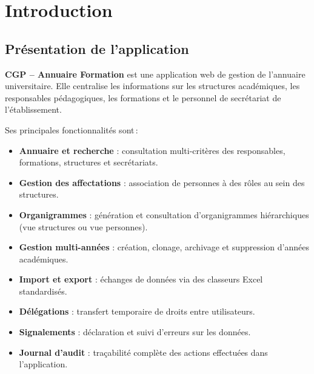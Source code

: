 \chapter{Introduction}
\label{chap:introduction}

\section{Pr\'esentation de l'application}

\textbf{CGP -- Annuaire Formation} est une application web de gestion de l'annuaire universitaire. Elle centralise les informations sur les structures acad\'emiques, les responsables p\'edagogiques, les formations et le personnel de secr\'etariat de l'\'etablissement.

Ses principales fonctionnalit\'es sont\,:

\begin{itemize}
  \item \textbf{Annuaire et recherche} : consultation multi-crit\`eres des responsables, formations, structures et secr\'etariats.
  \item \textbf{Gestion des affectations} : association de personnes \`a des r\^oles au sein des structures.
  \item \textbf{Organigrammes} : g\'en\'eration et consultation d'organigrammes hi\'erarchiques (vue structures ou vue personnes).
  \item \textbf{Gestion multi-ann\'ees} : cr\'eation, clonage, archivage et suppression d'ann\'ees acad\'emiques.
  \item \textbf{Import et export} : \'echanges de donn\'ees via des classeurs Excel standardis\'es.
  \item \textbf{D\'el\'egations} : transfert temporaire de droits entre utilisateurs.
  \item \textbf{Signalements} : d\'eclaration et suivi d'erreurs sur les donn\'ees.
  \item \textbf{Journal d'audit} : tra\c{c}abilit\'e compl\`ete des actions effectu\'ees dans l'application.
\end{itemize}


